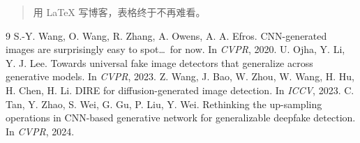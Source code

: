 \begin{quote}
用 \LaTeX{} 写博客，表格终于不再难看。
\end{quote}

\begin{thebibliography}{9}
   S.-Y. Wang, O. Wang, R. Zhang, A. Owens, A. A. Efros. CNN-generated images are surprisingly easy to spot\ldots\ for now. In \emph{CVPR}, 2020.
   U. Ojha, Y. Li, Y. J. Lee. Towards universal fake image detectors that generalize across generative models. In \emph{CVPR}, 2023.
   Z. Wang, J. Bao, W. Zhou, W. Wang, H. Hu, H. Chen, H. Li. DIRE for diffusion-generated image detection. In \emph{ICCV}, 2023.
   C. Tan, Y. Zhao, S. Wei, G. Gu, P. Liu, Y. Wei. Rethinking the up-sampling operations in CNN-based generative network for generalizable deepfake detection. In \emph{CVPR}, 2024.
\end{thebibliography}
